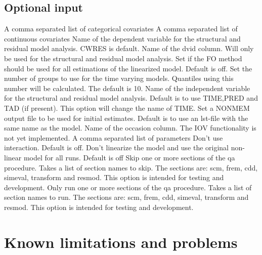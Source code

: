 \subsection{Optional input}



\begin{optionlist}
A comma separated list of categorical covariates
\nextopt
{}
A comma separated list of continuous covariates
\nextopt
{}
Name of the dependent variable for the structural and residual model analysis. CWRES is default.
\nextopt
{}
Name of the dvid column.
Will only be used for the structural and residual model analysis.
\nextopt
{}
Set if the FO method should be used for all estimations
of the linearized model. Default is off.
\nextopt
{}
Set the number of groups to use for the time varying models.
Quantiles using this number will be calculated.
The default is 10.
\nextopt
{}
Name of the independent variable for the structural and residual model analysis.
Default is to use TIME,PRED and TAD (if present). This option will change the name
of TIME.
\nextopt
{}
Set a NONMEM output file to be used for initial estimates.
Default is to use an lst-file with the same name as the model.
\nextopt
{}
Name of the occasion column.
The IOV functionality is not yet implemented.
\nextopt
{}
A comma separated list of parameters
\nextopt
        Don't use interaction. Default is off.
    \nextopt
      Don't linearize the model and use the original non-linear model for all runs. Default is off
    \nextopt
      Skip one or more sections of the qa procedure. Takes a list of
      section names to skip. The sections are: scm, frem, cdd, simeval,
      transform and resmod. This option is intended for testing and
      development.
    \nextopt
      Only run one or more sections of the qa procedure. Takes a list of
      section names to run. The sections are: scm, frem, cdd, simeval,
      transform and resmod. This option is intended for testing and
      development.
    \nextopt
\end{optionlist}

\section{Known limitations and problems}

